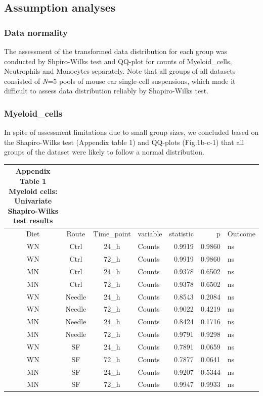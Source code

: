 \documentclass[
  12pt,
  letterpaper,
]{article}
\begin{document}
\subsection{Assumption analyses}\label{assumption-analyses}

\subsubsection{Data normality}\label{data-normality}

The assessment of the transformed data distribution for each group was conducted by Shpiro-Wilks test and QQ-plot for counts of Myeloid\_cells, Neutrophils and Monocytes separately. Note that all groups of all datasets consisted of \emph{N}=5 pools of mouse ear single-cell suspensions, which made it difficult to assess data distribution reliably by Shapiro-Wilks test.

\subsubsection{Myeloid\_cells}\label{myeloid_cells}

In spite of assessment limitations due to small group sizes, we concluded based on the Shapiro-Wilks test (Appendix table 1) and QQ-plots (Fig.1b-c-1) that all groups of the dataset were likely to follow a normal distribution.

\begingroup
\fontsize{12.0pt}{14.4pt}\selectfont
\begin{longtable}{ccclrrl}
\caption*{
{\large \textbf{Appendix Table 1}} \\ 
{\small \textbf{Myeloid cells: Univariate Shapiro-Wilks test results}}
} \\ 
\toprule
{Diet} & {Route} & Time\_point & {variable} & {statistic} & {p} & {Outcome} \\ 
\midrule\addlinespace[2.5pt]
WN & Ctrl & 24\_h & Counts & 0.9919 & 0.9860 & ns \\ 
WN & Ctrl & 72\_h & Counts & 0.9919 & 0.9860 & ns \\ 
MN & Ctrl & 24\_h & Counts & 0.9378 & 0.6502 & ns \\ 
MN & Ctrl & 72\_h & Counts & 0.9378 & 0.6502 & ns \\ 
WN & Needle & 24\_h & Counts & 0.8543 & 0.2084 & ns \\ 
WN & Needle & 72\_h & Counts & 0.9022 & 0.4219 & ns \\ 
MN & Needle & 24\_h & Counts & 0.8424 & 0.1716 & ns \\ 
MN & Needle & 72\_h & Counts & 0.9791 & 0.9298 & ns \\ 
WN & SF & 24\_h & Counts & 0.7891 & 0.0659 & ns \\ 
WN & SF & 72\_h & Counts & 0.7877 & 0.0641 & ns \\ 
MN & SF & 24\_h & Counts & 0.9207 & 0.5344 & ns \\ 
MN & SF & 72\_h & Counts & 0.9947 & 0.9933 & ns \\ 
\bottomrule
\end{longtable}
\endgroup
\end{document}
